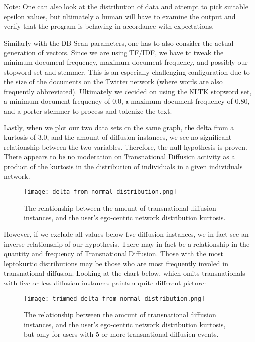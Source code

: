 Note: One can also look at the distribution of data and attempt to
pick suitable epsilon values, but ultimately a human will have to
examine the output and verify that the program is behaving in
accordance with expectations.

Similarly with the DB Scan parameters, one has to also consider the
actual generation of vectors. Since we are using TF/IDF, we have to
tweak the minimum document frequency, maximum document frequency, and
possibly our stopword set and stemmer. This is an especially
challenging configuration due to the size of the documents on the
Twitter network (where words are also frequently
abbreviated). Ultimately we decided on using the NLTK stopword set, a
minimum document frequency of 0.0, a maximum document frequency of
0.80, and a porter stemmer to process and tokenize the text.

Lastly, when we plot our two data sets on the same graph, the delta
from a kurtosis of 3.0, and the amount of diffusion instances, we see
no significant relationship between the two variables. Therefore, the
null hypothesis is proven. There appears to be no moderation on
Transnational Diffusion activity as a product of the kurtosis in the
distribution of individuals in a given individuals network.
\begin{figure}[H]
  \centering
  \texttt{[image: delta\_from\_normal\_distribution.png]}
  \caption{The relationship between the amount of transnational diffusion instances, and the user's ego-centric network distribution kurtosis.}
\end{figure}

However, if we exclude all values below five diffusion instances, we
in fact see an inverse relationship of our hypothesis. There may in fact
be a relationship in the quantity and frequency of Transnational
Diffusion. Those with the most leptokurtic distributions may be those
who are most frequently involed in transnational diffusion. Looking at the
chart below, which omits transnationals with five or less diffusion instances
paints a quite different picture:
\begin{figure}[H]
  \centering
  \texttt{[image: trimmed\_delta\_from\_normal\_distribution.png]}
  \caption{The relationship between the amount of transnational diffusion instances, and the user's ego-centric network distribution kurtosis, but only for users with 5 or more transnational diffusion events.}
\end{figure}
